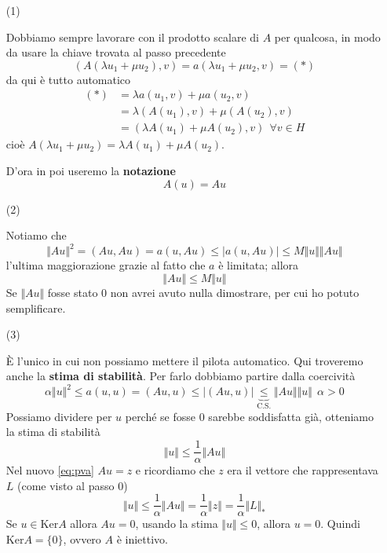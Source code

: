 \documentclass[10pt,a4paper,twoside,openright]{book}
\begin{document}
\begin{dimostrazione}
\begin{itemize}
		\item[(1)]

		Dobbiamo sempre lavorare con il prodotto scalare di $A$ per qualcosa, in modo da usare la chiave trovata al passo precedente
		\begin{equation*}
			(A(\lambda u_{1} +\mu u_{2}),v) =a(\lambda u_{1} +\mu u_{2},v) =(*)
		\end{equation*}
		da qui è tutto automatico
		\begin{align*}
			(*) & =\lambda a(u_{1},v) +\mu a(u_{2},v)\\
			    & =\lambda (A(u_{1}),v) +\mu (A(u_{2}),v)\\
			    & =(\lambda A(u_{1}) +\mu A(u_{2}),v) \ \ \forall v\in H
		\end{align*}
		cioè $A(\lambda u_{1} +\mu u_{2}) =\lambda A(u_{1}) +\mu A(u_{2})$.

		D'ora in poi useremo la \textbf{notazione}
		\begin{equation*}
			A(u) =Au
		\end{equation*}


		\item[(2)]

		Notiamo che
		\begin{equation*}
			\Vert Au\Vert ^{2} =(Au,Au) =a(u,Au) \leqslant | a(u,Au)| \leqslant M\Vert u\Vert \Vert Au\Vert 
		\end{equation*}
		l'ultima maggiorazione grazie al fatto che $a$ è limitata; allora
		\begin{equation*}
			\Vert Au\Vert \leqslant M\Vert u\Vert 
		\end{equation*}
		Se $\Vert Au\Vert $ fosse stato $0$ non avrei avuto nulla dimostrare, per cui ho potuto semplificare.



		\item[(3)]

		È l'unico in cui non possiamo mettere il pilota automatico. Qui troveremo anche la \textbf{stima di stabilità}. Per farlo dobbiamo partire dalla coercività
		\begin{equation*}
			\alpha \Vert u\Vert ^{2} \leqslant a(u,u) =(Au,u) \leqslant | (Au,u)| \underbrace{\leqslant }_{\text{C.S.}}\Vert Au\Vert \Vert u\Vert \ \ \alpha  >0
		\end{equation*}
		Possiamo dividere per $u$ perché se fosse $0$ sarebbe soddisfatta già, otteniamo la stima di stabilità
		\begin{equation*}
			\Vert u\Vert \leqslant \frac{1}{\alpha }\Vert Au\Vert 
		\end{equation*}
		Nel nuovo \eqref{eq:pva} $Au=z$ e ricordiamo che $z$ era il vettore che rappresentava $L$ (come visto al passo 0)
		\begin{equation*}
			\Vert u\Vert \leqslant \frac{1}{\alpha }\Vert Au\Vert =\frac{1}{\alpha }\Vert z\Vert =\frac{1}{\alpha }\Vert L\Vert _{*}
		\end{equation*}
		Se $u\in \mathrm{Ker} A$ allora $Au=0$, usando la stima $\Vert u\Vert \leqslant 0$, allora $u=0$. Quindi $\mathrm{Ker} A=\{0\}$, ovvero $A$ è iniettivo.




\end{itemize}
\end{dimostrazione}
\end{document}

